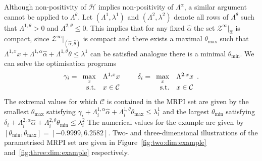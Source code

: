\documentclass[letterpaper, 10pt, conference]{ieeeconf} %
\begin{document}
Although non-positivity of $\mathcal H$ implies non-positivity of $\Lambda^\alpha$, a similar argument cannot be applied to $\Lambda^\theta$.
Let $(\Lambda^1,\lambda^1)$ and $(\Lambda^2,\lambda^2)$ denote all rows of $\Lambda^\theta$ such that $\Lambda^{1,\theta}>0$ and
$\Lambda^{2,\theta}\leq0$. This implies that for any fixed $\hat\alpha$ the set $\mathcal Z^\infty\vert_{\hat\alpha}$
is compact, since $\mathcal Z^\infty\vert_{(\hat\alpha,\hat\theta)}$ is compact and there exists a maximal $\theta_{\max}$
such that $\Lambda^{1,x}x+\Lambda^{1,\alpha}\hat\alpha+\Lambda^{1,\theta}\theta\leq\lambda^1$ can be satisfied
analogue there is a minimal $\theta_{\min}$. We can solve the optimisation programs
$$
	\gamma_i = \begin{array}[t]{rl}
	\displaystyle\max_x& \Lambda^{1,x}x\\
	\text{s.t.}& x\in\mathcal C
	\end{array}
	\qquad
	\delta_i = \begin{array}[t]{rl}
	\displaystyle\max_x& \Lambda^{2,x}x\\
	\text{s.t.}& x\in\mathcal C
	\end{array}
	.
$$
The extremal values for which $\mathcal C$ is contained in the MRPI set are given by
the smallest $\theta_{\max}$ satisfying $\gamma_i+\Lambda^{1,\alpha}_i\hat\alpha+
\Lambda^{1,\theta}_i\theta_{\max}\leq\lambda_i^1$ and the largest $\theta_{\min}$ 
satisfying $\delta_i+\Lambda^{2,\alpha}_i\hat\alpha+\Lambda^{2,\theta}_i\theta_{\min}\leq\lambda_i^2$
The numerical values for the example are given by $[\theta_{\min},\theta_{\max}]=[-0.9999,6.2582]$.
Two- and three-dimensional illustrations of the parametrised MRPI set are given in Figure~\ref{fig:two:dim:example}
and~\ref{fig:three:dim:example} respectively.
%
%
%
\end{document}

